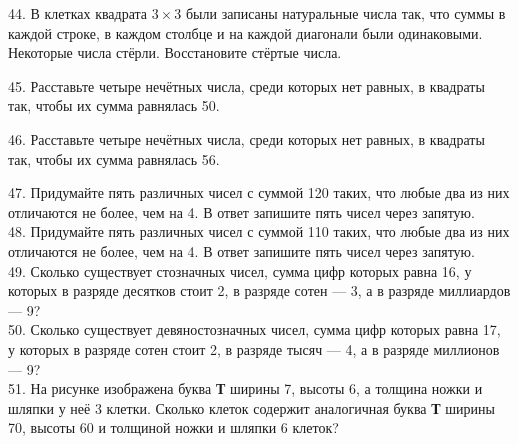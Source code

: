 \begin{center}
\begin{figure}[ht!]
\end{figure}
\end{center}
44. В клетках квадрата $3\times3$ были записаны натуральные числа так, что суммы в каждой строке, в каждом столбце и на каждой диагонали были одинаковыми. Некоторые числа стёрли. Восстановите стёртые числа.
\begin{center}
\begin{figure}[ht!]
\end{figure}
\end{center}
45. Расставьте четыре нечётных числа, среди которых нет равных, в квадраты так, чтобы их сумма равнялась 50.
\begin{center}
\begin{figure}[ht!]
\end{figure}
\end{center}
46. Расставьте четыре нечётных числа, среди которых нет равных, в квадраты так, чтобы их сумма равнялась 56.
\begin{center}
\begin{figure}[ht!]
\end{figure}
\end{center}
47. Придумайте пять различных чисел с суммой 120 таких, что любые два из них отличаются не более, чем на 4. В ответ запишите пять чисел через запятую.\\
48. Придумайте пять различных чисел с суммой 110 таких, что любые два из них отличаются не более, чем на 4. В ответ запишите пять чисел через запятую.\\
49. Сколько существует стозначных чисел, сумма цифр которых равна 16, у которых в разряде десятков стоит 2, в разряде сотен --- 3, а в разряде миллиардов --- 9?\\
50. Сколько существует девяностозначных чисел, сумма цифр которых равна 17, у которых в разряде сотен стоит 2, в разряде тысяч --- 4, а в разряде миллионов --- 9?\\
51. На рисунке изображена буква {\bf Т} ширины 7, высоты 6, а толщина ножки и шляпки у неё 3 клетки. Сколько клеток содержит аналогичная буква {\bf Т} ширины 70, высоты 60 и толщиной ножки и шляпки 6 клеток?
\begin{center}
\begin{figure}[ht!]
\end{figure}
\end{center}

